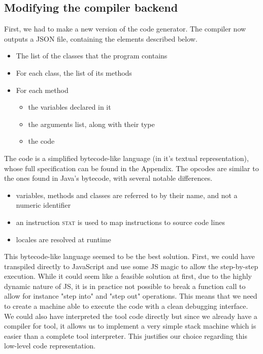 \subsection{Modifying the compiler backend}
\label{backend}

First, we had to make a new version of the code generator. The compiler now outputs a JSON file, containing the elements described below.

\begin{itemize}
\item The list of the classes that the program contains
\item For each class, the list of its methods
\item For each method
	\begin{itemize}
	\item the variables declared in it
	\item the arguments list, along with their type
	\item the code
	\end{itemize}
\end{itemize}

The code is a simplified bytecode-like language (in it's textual representation), whose full specification can be found in the Appendix. The opcodes are similar to the ones found in Java's bytecode, with several notable differences.

\begin{itemize}
\item variables, methods and classes are referred to by their name, and not a numeric identifier
\item an instruction \textsc{stat} is used to map instructions to source code lines
\item locales are resolved at runtime
\end{itemize}

This bytecode-like language seemed to be the best solution. First, we could have transpiled directly to JavaScript and use some JS magic to allow the step-by-step execution. While it could seem like a feasible solution at first, due to the highly dynamic nature of JS, it is in practice not possible to break a function call to allow for instance "step into" and "step out" operations. This means that we need to create a machine able to execute the code with a clean debugging interface. We could also have interpreted the tool code directly but since we already have a compiler for tool, it allows us to implement a very simple stack machine which is easier than a complete tool interpreter. This justifies our choice regarding this low-level code representation.

